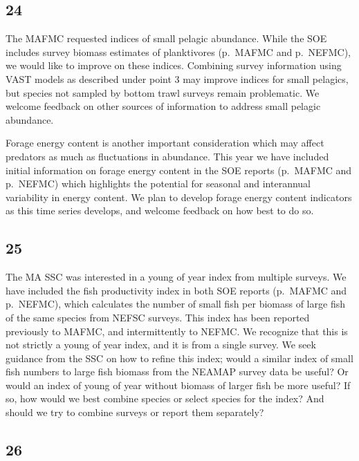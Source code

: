 \documentclass[
  10pt,
]{article}
\begin{document}
\hypertarget{section-23}{%
\subsection{24}\label{section-23}}

The MAFMC requested indices of small pelagic abundance. While the SOE
includes survey biomass estimates of planktivores (p.~MAFMC and
p.~NEFMC), we would like to improve on these indices. Combining survey
information using VAST models as described under point 3 may improve
indices for small pelagics, but species not sampled by bottom trawl
surveys remain problematic. We welcome feedback on other sources of
information to address small pelagic abundance.

Forage energy content is another important consideration which may
affect predators as much as fluctuations in abundance. This year we have
included initial information on forage energy content in the SOE reports
(p.~MAFMC and p.~NEFMC) which highlights the potential for seasonal and
interannual variability in energy content. We plan to develop forage
energy content indicators as this time series develops, and welcome
feedback on how best to do so.

\hypertarget{section-24}{%
\subsection{25}\label{section-24}}

The MA SSC was interested in a young of year index from multiple
surveys. We have included the fish productivity index in both SOE
reports (p.~MAFMC and p.~NEFMC), which calculates the number of small
fish per biomass of large fish of the same species from NEFSC surveys.
This index has been reported previously to MAFMC, and intermittently to
NEFMC. We recognize that this is not strictly a young of year index, and
it is from a single survey. We seek guidance from the SSC on how to
refine this index; would a similar index of small fish numbers to large
fish biomass from the NEAMAP survey data be useful? Or would an index of
young of year without biomass of larger fish be more useful? If so, how
would we best combine species or select species for the index? And
should we try to combine surveys or report them separately?

\hypertarget{section-25}{%
\subsection{26}\label{section-25}}
\end{document}
